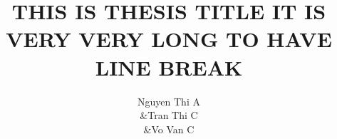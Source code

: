 \documentclass{myclass}
\title{THIS IS THESIS TITLE IT IS VERY VERY LONG TO HAVE LINE BREAK}
\begin{document}
\author{Nguyen Thi A\\  &Tran Thi C \\ &Vo Van C}
\printcoverpage  

\acknowledgements{}
\printfrontmatter






\end{document}
